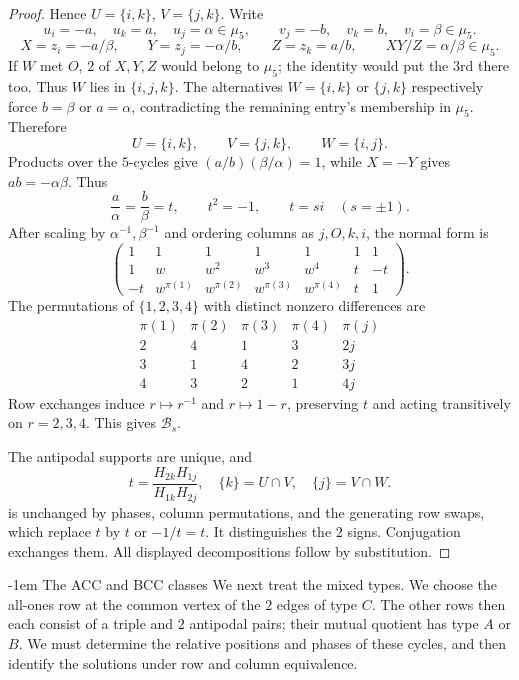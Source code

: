 \documentclass[11pt,a4paper]{article}
\makeatletter
\theoremstyle{plain}
\theoremstyle{definition}
\numberwithin{equation}{section}
\renewcommand\subsection{\@startsection{subsection}{2}{\z@}  {\medskipamount}  {-1em}  {\normalfont\normalsize\bfseries}}
\makeatother
\begin{document}
\begin{proof}
Hence $U=\{i,k\}$, $V=\{j,k\}$. Write
$$
 u_i=-a,\quad u_k=a,\quad u_j=\alpha\in\mu_5,
 \qquad v_j=-b,\quad v_k=b,\quad v_i=\beta\in\mu_5.
$$
\begin{equation}
 X=z_i=-a/\beta,\qquad Y=z_j=-\alpha/b,\qquad Z=z_k=a/b,
 \qquad XY/Z=\alpha/\beta\in\mu_5. \label{ab:eq2}
\end{equation}
If $W$ met $O$, $2$ of $X,Y,Z$ would belong to $\mu_5$; the identity would put the $3$rd there too. Thus $W$ lies in $\{i,j,k\}$. The alternatives $W=\{i,k\}$ or $\{j,k\}$ respectively force $b=\beta$ or $a=\alpha$, contradicting the remaining entry's membership in $\mu_5$. Therefore
$$U=\{i,k\},\qquad V=\{j,k\},\qquad W=\{i,j\}.$$
Products over the $5$-cycles give $(a/b)(\beta/\alpha)=1$, while $X=-Y$ gives $ab=-\alpha\beta$. Thus
\begin{equation}
 \frac a\alpha=\frac b\beta=t,\qquad t^2=-1,
 \qquad t=si\quad(s=\pm1). \label{ab:eq3}
\end{equation}
After scaling by $\alpha^{-1},\beta^{-1}$ and ordering columns as $j,O,k,i$, the normal form is
\begin{equation}
 \begin{pmatrix}
 1&1&1&1&1&1&1\\
 1&w&w^2&w^3&w^4&t&-t\\
 -t&w^{\pi(1)}&w^{\pi(2)}&w^{\pi(3)}&w^{\pi(4)}&t&1
 \end{pmatrix}. \label{ab:eq4}
\end{equation}
The permutations of $\{1,2,3,4\}$ with distinct nonzero differences are
$$
\begin{array}{rrrr|c}
\pi(1)&\pi(2)&\pi(3)&\pi(4)&\pi(j)\\\hline
2&4&1&3&2j\\
3&1&4&2&3j\\
4&3&2&1&4j
\end{array}
$$
Row exchanges induce $r\mapsto r^{-1}$ and $r\mapsto1-r$, preserving $t$ and acting transitively on $r=2,3,4$. This gives $\mathcal B_s$.

The antipodal supports are unique, and
$$
 t=\frac{H_{2k}H_{1j}}{H_{1k}H_{2j}},
 \quad \{k\}=U\cap V,\quad\{j\}=V\cap W.
$$
is unchanged by phases, column permutations, and the generating row swaps, which replace $t$ by $t$ or $-1/t=t$. It distinguishes the $2$ signs. Conjugation exchanges them. All displayed decompositions follow by substitution.
\end{proof}

\subsection{The ACC and BCC classes}\label{n7:sec:mixed}
We next treat the mixed types. We choose the all-ones row at the common vertex of the $2$ edges of type $C$. The other rows then each consist of a triple and $2$ antipodal pairs; their mutual quotient has type $A$ or $B$. We must determine the relative positions and phases of these cycles, and then identify the solutions under row and column equivalence.
\end{document}
